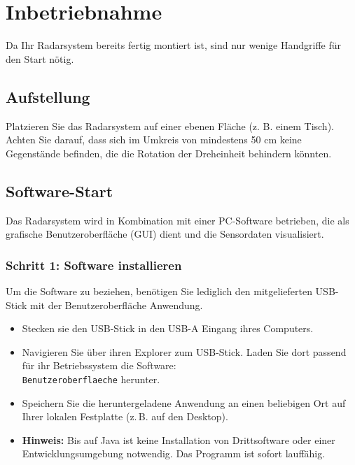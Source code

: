 %
%

\chapter{Inbetriebnahme}
Da Ihr Radarsystem bereits fertig montiert ist, sind nur wenige Handgriffe für den Start nötig.

\section{Aufstellung}
Platzieren Sie das Radarsystem auf einer ebenen Fläche (z. B. einem Tisch). Achten Sie darauf, dass sich im Umkreis von mindestens 50 cm keine Gegenstände befinden, die die Rotation der Dreheinheit behindern könnten.

\section{Software-Start}

Das Radarsystem wird in Kombination mit einer PC-Software betrieben, die als grafische Benutzeroberfläche (GUI) dient und die Sensordaten visualisiert. 

\subsection*{Schritt 1: Software installieren}
Um die Software zu beziehen, benötigen Sie lediglich den mitgelieferten USB-Stick mit der Benutzeroberfläche Anwendung.

\begin{itemize}
	\item Stecken sie den USB-Stick in den USB-A Eingang ihres Computers.
	\item Navigieren Sie über ihren Explorer zum USB-Stick. Laden Sie dort passend für ihr Betriebssystem die Software: \\
	\texttt{Benutzeroberflaeche} herunter.
	\item Speichern Sie die heruntergeladene Anwendung an einen beliebigen Ort auf Ihrer lokalen Festplatte (z.\,B. auf den Desktop).
	
	\item \textbf{Hinweis:} Bis auf Java ist keine Installation von Drittsoftware oder einer Entwicklungsumgebung  notwendig. Das Programm ist sofort lauffähig.
\end{itemize}

